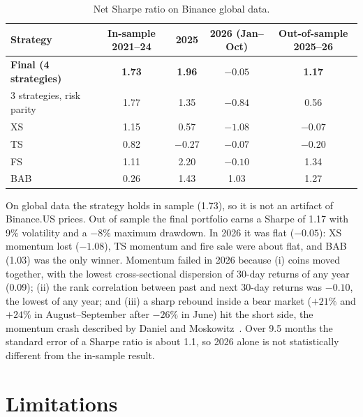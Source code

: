 \documentclass[aps,prl,onecolumn,superscriptaddress,nofootinbib]{revtex4-2}
\begin{document}
	\begin{table}[!htbp]
		\caption{Net Sharpe ratio on Binance global data.}
		\label{tab:oos}
		\begin{ruledtabular}
			\begin{tabular}{lcccc}
				Strategy & In-sample 2021--24 & 2025 & 2026 (Jan--Oct) & Out-of-sample 2025--26 \\
				\hline
				\textbf{Final (4 strategies)} & \textbf{1.73} & \textbf{1.96} & $\mathbf{-0.05}$ & \textbf{1.17} \\
				3 strategies, risk parity     & 1.77 & 1.35    & $-0.84$ & 0.56 \\
				XS                            & 1.15 & 0.57    & $-1.08$ & $-0.07$ \\
				TS                            & 0.82 & $-0.27$ & $-0.07$ & $-0.20$ \\
				FS                            & 1.11 & 2.20    & $-0.10$ & 1.34 \\
				BAB                           & 0.26 & 1.43    & 1.03    & 1.27 \\
			\end{tabular}
		\end{ruledtabular}
	\end{table}
	
	On global data the strategy holds in sample (1.73), so it is not an artifact of Binance.US prices. Out of sample the final portfolio earns a Sharpe of 1.17 with 9\% volatility and a $-8\%$ maximum drawdown. In 2026 it was flat ($-0.05$): XS momentum lost ($-1.08$), TS momentum and fire sale were about flat, and BAB (1.03) was the only winner. Momentum failed in 2026 because (i) coins moved together, with the lowest cross-sectional dispersion of 30-day returns of any year (0.09); (ii) the rank correlation between past and next 30-day returns was $-0.10$, the lowest of any year; and (iii) a sharp rebound inside a bear market ($+21\%$ and $+24\%$ in August--September after $-26\%$ in June) hit the short side, the momentum crash described by Daniel and Moskowitz~\cite{daniel2016}. Over 9.5 months the standard error of a Sharpe ratio is about 1.1, so 2026 alone is not statistically different from the in-sample result.
	
	\section{Limitations}
	\label{app:limits}
	
\end{document}
